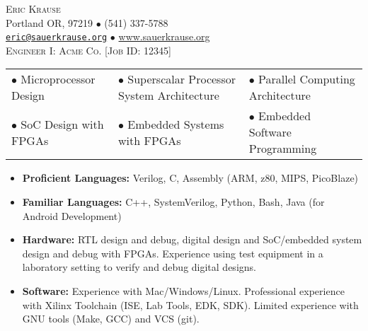 \documentclass{article}
\begin{document}
\fancyhf{}

\vspace*{-.5in} %

\begin{center}
	{\LARGE \scshape {Eric Krause}}	\\
	Portland OR, 97219  $\bullet$ (541) 337-5788\\
	\texttt{\href{mailto:eric@sauerkrause.org}{eric@sauerkrause.org}}
  $\bullet$  \url{www.sauerkrause.org}\\
  {\small \scshape Engineer I: Acme Co. [Job ID: 12345]}
\end{center}



	\hspace{-4pt}


	
	
	\vspace{-5pt}


	\begin{table}[h!]
	\small\vspace{-8pt}
	\begin{tabular}{lll}
	$\bullet$ Microprocessor Design & $\bullet$ Superscalar Processor System Architecture & $\bullet$ Parallel Computing Architecture\\
	$\bullet$ SoC Design with FPGAs & $\bullet$ Embedded Systems with FPGAs & $\bullet$ Embedded Software Programming\\
	\end{tabular}
	\vspace{-17pt}
\end{table}	


 \vspace{-6pt}
	\begin{itemize}\setlength{\itemsep}{-4pt}

		\item\textbf{Proficient Languages:} Verilog, C, Assembly (ARM, z80, MIPS, PicoBlaze)
		\item\textbf{Familiar Languages:} C++, SystemVerilog, Python, Bash, Java (for Android Development)
		\item\textbf{Hardware:} RTL design and debug, digital design and SoC/embedded system design and debug with FPGAs.  Experience using test equipment in a laboratory setting to verify and debug digital designs.
		\item\textbf{Software:} Experience with Mac/Windows/Linux.  Professional experience with Xilinx Toolchain (ISE, Lab Tools, EDK, SDK).  Limited experience with GNU tools (Make, GCC) and VCS (git).
	\end{itemize}
	\vspace{-8pt}
\end{document}
